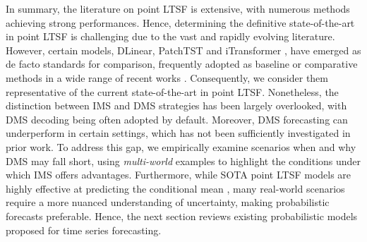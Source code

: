 \documentclass[a4paper,oneside,bibliography=totoc]{scrbook}
\begin{document}
\noindent
In summary, the literature on point LTSF is extensive, with numerous methods achieving strong performances. 
Hence, determining the definitive state-of-the-art in point LTSF is challenging due to the vast and rapidly evolving literature. However, certain models, DLinear, PatchTST and iTransformer \cite{zeng_are_2023, nie_time_2022, liu_itransformer_2023}, have emerged as de facto standards for comparison, frequently adopted as baseline or comparative methods in a wide range of recent works \cite{jia_pgn_2024, jia_witran_2023, lu_cats_2024, lin_segrnn_2023, han_softs_2024, lin_cyclenet_2024, luo_deformabletst_2024, hu_attractor_2024, shang_ada-mshyper_2024}. Consequently, we consider them representative of the current state-of-the-art in point LTSF.
Nonetheless, the distinction between IMS and DMS strategies has been largely overlooked, with DMS decoding being often adopted by default. 
Moreover, DMS forecasting can underperform in certain settings, 
which
has not been sufficiently investigated in prior work.
To address this gap, we empirically examine scenarios when and why DMS may fall short, using \textit{multi-world} examples to highlight the conditions under which IMS offers advantages. 
Furthermore, while SOTA point LTSF models are highly effective at predicting the conditional mean \cite{li_transformer-modulated_2023}, many real-world scenarios require a more nuanced understanding of uncertainty, making probabilistic forecasts preferable.
Hence, the next section reviews existing probabilistic models proposed for time series forecasting.
\end{document}
